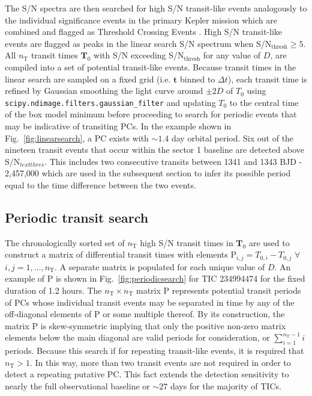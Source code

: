The S/N spectra are then searched for high S/N transit-like events analogously to the individual
significance events in the primary Kepler mission which are combined and flagged as Threshold Crossing
Events \citep{jenkins10}.
High S/N transit-like events are flagged as peaks in the linear search S/N spectrum when
S/N$_{\text{thresh}}\geq 5$.
All $n_{\text{T}}$ transit times $\mathbf{T}_0$ with S/N exceeding S/N$_{\text{thresh}}$ for
any value of $D$, are compiled into a set of potential transit-like events.
Because transit times in the linear search are sampled on a fixed grid (i.e.
$\mathbf{t}$ binned to $\Delta t$), each transit time is refined by Gaussian smoothing the light curve
around $\pm 2D$ of $T_0$ using \texttt{scipy.ndimage.filters.gaussian\_filter} and updating $T_0$ to the
central time of the box model minimum before proceeding to search for periodic events that may
be indicative of transiting PCs. In the example shown in Fig.~\ref{fig:linearsearch},
a PC exists with $\sim 1.4$ day orbital period. Six out of the nineteen transit events
that occur within the sector 1 baseline are detected above S/N$_{text{thres}}$. This includes two
consecutive transits between 1341 and 1343 BJD - 2,457,000 which are used in the subsequent
section to infer its possible period equal to the time difference between the two events. 

\subsection{Periodic transit search} \label{sect:periodic}
The chronologically sorted set of $n_{\text{T}}$ high S/N transit times in $\mathbf{T}_0$
are used to construct a matrix of differential transit times with
elements P$_{i,j} = T_{0,i} - T_{0,j}$ $\forall$ $i,j=1,\dots,n_{\text{T}}$.
A separate matrix is populated for each unique value of $D$. An example of
P is shown in Fig.~\ref{fig:periodicsearch} for TIC 234994474 for the fixed duration of 1.2 hours. 
The $n_{\text{T}} \times n_{\text{T}}$ matrix P represents potential transit periods of
PCs whose individual transit events
may be separated in time by any of the off-diagonal elements of P or some multiple thereof.
By its construction, the matrix P is skew-symmetric implying that only the positive non-zero matrix elements
below the main diagonal are valid periods for consideration, or $\sum_{i=1}^{n_{\text{T}}-1}i$ periods.
Because this search if for repeating transit-like events, it is required that $n_{\text{T}}>1$. In this
way, more than two transit events are not required in order to detect a repeating putative 
PC. This fact extends the \pipeline{} detection sensitivity to nearly the full observational baseline
or $\sim 27$ days for the majority of TICs. \\


